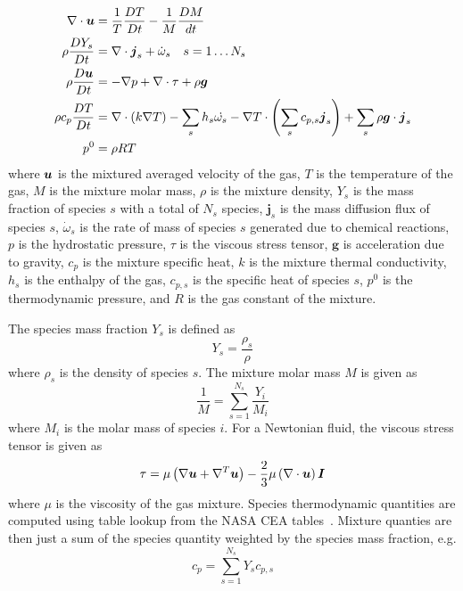 \begin{equation}
\begin{aligned}
\nabla \cdot \bu &= \frac{1}{T}\frac{DT}{Dt} - \frac{1}{M}\frac{DM}{dt} \\ %
\rho \frac{D Y_s}{D t} &= \nabla \cdot \boldsymbol{j}_s + \dot{\omega}_s \quad s = 1 \dots N_s \\
\rho \frac{D\bu}{Dt} &= -\nabla p + \nabla \cdot \mathbf{\tau} + \rho \boldsymbol{g} \\
\rho c_p \frac{DT}{Dt} %
&= \nabla \cdot \left(k \nabla T \right) - \sum_s h_s \dot{\omega_s} -
\nabla T  \cdot \left( \sum_{s} c_{p,s} \boldsymbol{j}_s \right) +
\sum_{s} \rho \boldsymbol{g} \cdot \boldsymbol{j}_s \\
p^0 &= \rho R T
\end{aligned}
\end{equation}
where $\boldsymbol{u}$ is the mixtured averaged velocity of the gas, $T$ is the temperature of the
gas, $M$ is the mixture molar mass, $\rho$ is the mixture density,
$Y_s$ is the mass fraction of species $s$ with a total of $N_s$ species, $\boldsymbol{j}_s$ is the
mass diffusion flux of species $s$, $\dot{\omega}_s$ is the rate of mass of
species $s$ generated due to chemical reactions, $p$ is the
hydrostatic pressure, $\tau$ is the viscous stress tensor,
$\boldsymbol{g}$ is acceleration due to gravity, $c_p$ is the mixture
specific heat, $k$ is the mixture thermal conductivity, $h_s$ is the
enthalpy of the gas, $c_{p,s}$ is the specific heat of species $s$,
$p^0$ is the thermodynamic pressure, and $R$ is the gas constant of
the mixture.

The species mass fraction $Y_s$ is defined as
%
\begin{equation}
  Y_s = \frac{\rho_s}{\rho}
\end{equation}
%
where $\rho_s$ is the density of species $s$.
The mixture molar mass $M$ is given as
%
\begin{equation}
  \frac{1}{M} = \sum_{s=1}^{N_s} \frac{Y_i}{M_i}
\end{equation}
%
where $M_i$ is the molar mass of species $i$.
%
For a Newtonian fluid, the viscous stress tensor is given as
%
\begin{equation}\label{eq:stress_tensor}
  \tau = \mu\left(\nabla\boldsymbol{u} + \nabla^{T}\boldsymbol{u}\right) -\frac{2}{3}\mu \left(\nabla\cdot\boldsymbol{u}\right)\boldsymbol{I}
\end{equation}
%
where $\mu$ is the viscosity of the gas mixture.
%
Species thermodynamic quantities are computed using table lookup from the NASA
CEA tables~\cite{CEATables}.
Mixture quanties are then just a sum of the species
quantity weighted by the species mass fraction, e.g.
%
\begin{equation}
  c_p = \sum_{s=1}^{N_s} Y_s c_{p,s}
\end{equation}
%

